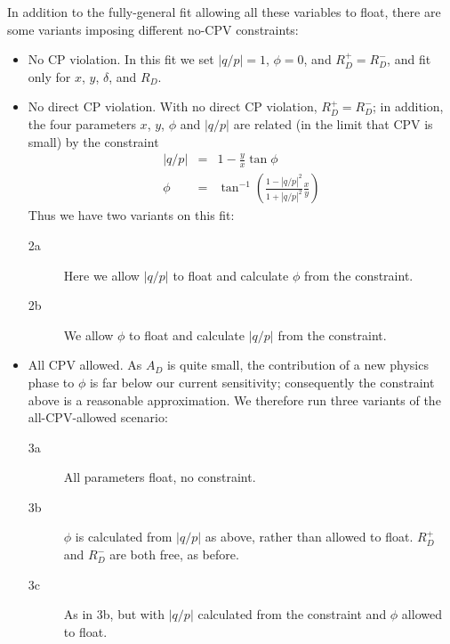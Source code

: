 In addition to the fully-general fit allowing all these variables to float, 
there are some variants imposing different no-CPV constraints:
\begin{itemize}
\item No CP violation. In this fit we set $|q/p|=1$, $\phi=0$, and $R_D^+=R_D^-$, 
and fit only for $x$, $y$, $\delta$, and $R_D$. 
\item No direct CP violation. With no direct CP violation, $R_D^+=R_D^-$;
in addition, the four parameters $x$, $y$, $\phi$ and $|q/p|$ are related 
(in the limit that CPV is small) by the constraint
\begin{eqnarray}
|q/p| &=& 1 - \frac{y}{x}\tan\phi\\
\phi &=& \tan^{-1}\left(\frac{1-|q/p|^2}{1+|q/p|^2}\frac{x}{y}\right)
\end{eqnarray}
Thus we have two variants on this fit:
\begin{description}
\item[2a] Here we allow $|q/p|$ to float and calculate $\phi$
from the constraint. 
\item[2b] We allow $\phi$ to float and calculate $|q/p|$ from the constraint. 
\end{description}
\item All CPV allowed. As $A_D$ is quite
small, the contribution of a new physics phase to $\phi$ is far below
our current sensitivity; consequently the constraint above is a reasonable
approximation. We therefore run three variants of the all-CPV-allowed 
scenario:
\begin{description}
\item[3a] All parameters float, no constraint.
\item[3b] $\phi$ is calculated from $|q/p|$ as above, rather than allowed to float.
$R_D^+$ and $R_D^-$ are both free, as before.
\item[3c] As in 3b, but with $|q/p|$ calculated from the constraint and $\phi$ allowed
to float.
\end{description}
\end{itemize}

